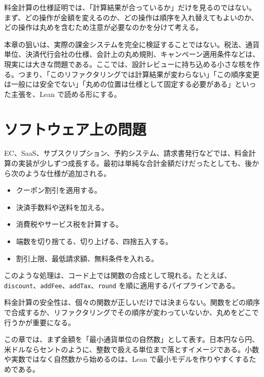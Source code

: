 \begin{intuitionbox}
料金計算の仕様証明では、「計算結果が合っているか」だけを見るのではない。まず、どの操作が金額を変えるのか、どの操作は順序を入れ替えてもよいのか、どの操作は丸めを含むため注意が必要なのかを分けて考える。
\end{intuitionbox}


本章の狙いは、実際の課金システムを完全に検証することではない。税法、通貨単位、決済代行会社の仕様、会計上の丸め規則、キャンペーン適用条件などは、現実には大きな問題である。ここでは、設計レビューに持ち込める小さな核を作る。つまり、「このリファクタリングでは計算結果が変わらない」「この順序変更は一般には安全でない」「丸めの位置は仕様として固定する必要がある」といった主張を、Lean で読める形にする。

\section{ソフトウェア上の問題}

EC、SaaS、サブスクリプション、予約システム、請求書発行などでは、料金計算の実装が少しずつ成長する。最初は単純な合計金額だけだったとしても、後から次のような仕様が追加される。

\begin{itemize}
\item クーポン割引を適用する。
\item 決済手数料や送料を加える。
\item 消費税やサービス税を計算する。
\item 端数を切り捨てる、切り上げる、四捨五入する。
\item 割引上限、最低請求額、無料条件を入れる。
\end{itemize}

このような処理は、コード上では関数の合成として現れる。たとえば、\texttt{discount}、\texttt{addFee}、\texttt{addTax}、\texttt{round} を順に適用するパイプラインである。

\begin{softwarebox}
料金計算の安全性は、個々の関数が正しいだけでは決まらない。関数をどの順序で合成するか、リファクタリングでその順序が変わっていないか、丸めをどこで行うかが重要になる。
\end{softwarebox}

この章では、まず金額を「最小通貨単位の自然数」として表す。日本円なら円、米ドルならセントのように、整数で扱える単位まで落とすイメージである。小数や実数ではなく自然数から始めるのは、Lean で最小モデルを作りやすくするためである。

